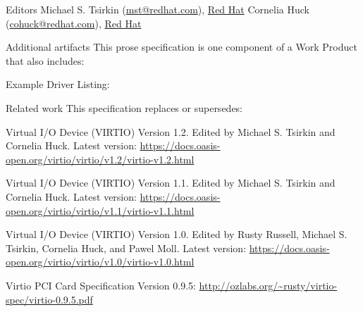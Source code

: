 \begin{titlepage}
\begin{oasistitlesection}{Editors}
Michael S. Tsirkin (\href{mailto:mst@redhat.com}{mst@redhat.com}), \href{https://www.redhat.com/}{Red Hat}\newline
Cornelia Huck (\href{mailto:cohuck@redhat.com}{cohuck@redhat.com}), \href{https://www.redhat.com/}{Red Hat}\newline
\end{oasistitlesection}


\begin{oasistitlesection}{Additional artifacts}
This prose specification is one component of a Work Product that also includes:
\begin{itemize*}
	\item Example Driver Listing: \newline
	\virtiourllistings
\end{itemize*}
\end{oasistitlesection}
\vspace{-0.2in}

\begin{oasistitlesection}{Related work}
This specification replaces or supersedes:
\begin{itemize*}
	\item Virtual I/O Device (VIRTIO) Version 1.2. Edited by Michael S. Tsirkin and Cornelia Huck. Latest version:\newline
	\url{https://docs.oasis-open.org/virtio/virtio/v1.2/virtio-v1.2.html}
	\item Virtual I/O Device (VIRTIO) Version 1.1. Edited by Michael S. Tsirkin and Cornelia Huck. Latest version:\newline
	\url{https://docs.oasis-open.org/virtio/virtio/v1.1/virtio-v1.1.html}
	\item Virtual I/O Device (VIRTIO) Version 1.0. Edited by Rusty Russell, Michael S. Tsirkin, Cornelia Huck, and Pawel
 Moll. Latest version:\newline
	\url{https://docs.oasis-open.org/virtio/virtio/v1.0/virtio-v1.0.html}
	\item Virtio PCI Card Specification Version 0.9.5:\newline
	\url{http://ozlabs.org/~rusty/virtio-spec/virtio-0.9.5.pdf}
\end{itemize*}
\end{oasistitlesection}
\vspace{-0.2in}


\end{titlepage}
